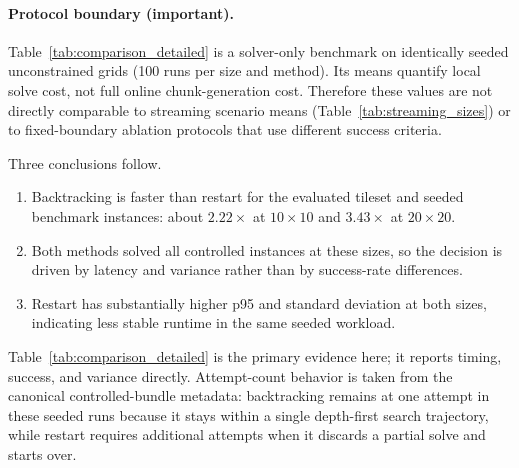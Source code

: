 \documentclass[12pt,a4paper]{report}
\begin{document}
\paragraph{Protocol boundary (important).} Table~\ref{tab:comparison_detailed} is a solver-only benchmark on identically seeded unconstrained grids (100 runs per size and method). Its means quantify local solve cost, not full online chunk-generation cost. Therefore these values are not directly comparable to streaming scenario means (Table~\ref{tab:streaming_sizes}) or to fixed-boundary ablation protocols that use different success criteria.

\begin{table}[H]
\centering
\small
{}
\caption{Controlled comparison from the canonical bundle (100 seeded runs per method at each size).}
\label{tab:comparison_detailed}
\end{table}

Three conclusions follow.
\begin{enumerate}
\item Backtracking is faster than restart for the evaluated tileset and seeded benchmark instances: about $2.22\times$ at $10 \times 10$ and $3.43\times$ at $20 \times 20$.
\item Both methods solved all controlled instances at these sizes, so the decision is driven by latency and variance rather than by success-rate differences.
\item Restart has substantially higher p95 and standard deviation at both sizes, indicating less stable runtime in the same seeded workload.
\end{enumerate}

Table~\ref{tab:comparison_detailed} is the primary evidence here; it reports timing, success, and variance directly. Attempt-count behavior is taken from the canonical controlled-bundle metadata: backtracking remains at one attempt in these seeded runs because it stays within a single depth-first search trajectory, while restart requires additional attempts when it discards a partial solve and starts over.
\end{document}
